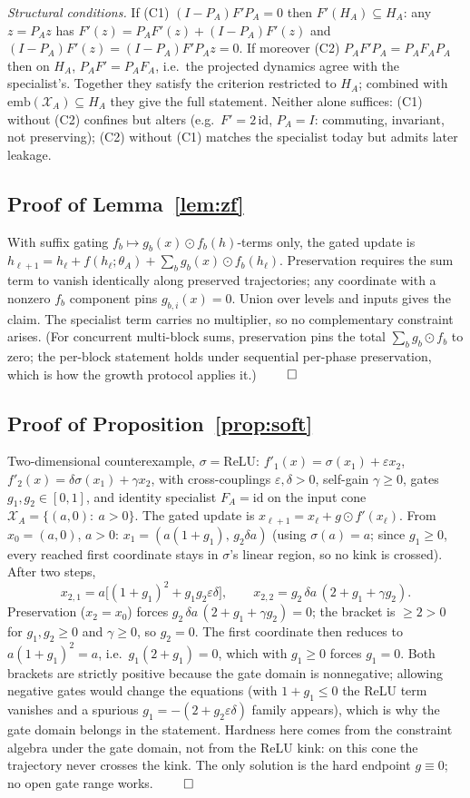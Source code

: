 \documentclass[11pt]{article}
\theoremstyle{definition}\newtheorem{definition}{Definition}
\theoremstyle{remark}\newtheorem{remark}{Remark}
\newcommand{\Xa}{\mathcal{X}_A}
\begin{document}
\emph{Structural conditions.} If (C1) $(I-P_A)F'P_A=0$ then $F'(H_A)\subseteq H_A$: any
$z=P_Az$ has $F'(z)=P_AF'(z)+(I-P_A)F'(z)$ and $(I-P_A)F'(z)=(I-P_A)F'P_Az=0$. If moreover
(C2) $P_AF'P_A=P_AF_AP_A$ then on $H_A$, $P_AF'=P_AF_A$, i.e.\ the projected dynamics agree
with the specialist's. Together they satisfy the criterion restricted to $H_A$; combined
with $\mathrm{emb}(\Xa)\subseteq H_A$ they give the full statement. Neither alone suffices: (C1)
without (C2) confines but alters (e.g.\ $F'=2\,\mathrm{id}$, $P_A=I$: commuting, invariant,
not preserving); (C2) without (C1) matches the specialist today but admits later leakage.

\subsection{Proof of Lemma~\ref{lem:zf}}
With suffix gating $f_b\mapsto g_b(x)\odot f_b(h)$-terms only, the gated update is
$h_{\ell+1}=h_\ell+f(h_\ell;\theta_A)+\sum_b g_b(x)\odot f_b(h_\ell)$. Preservation
requires the sum term to vanish identically along preserved trajectories; any coordinate
with a nonzero $f_b$ component pins $g_{b,i}(x)=0$. Union over levels and inputs gives the
claim. The specialist term carries no multiplier, so no complementary constraint arises.
(For concurrent multi-block sums, preservation pins the total $\sum_b g_b\odot f_b$ to
zero; the per-block statement holds under sequential per-phase preservation, which is how
the growth protocol applies it.)
\hfill$\qed$

\subsection{Proof of Proposition~\ref{prop:soft}}
Two-dimensional counterexample, $\sigma=\mathrm{ReLU}$:
$f'_1(x)=\sigma(x_1)+\varepsilon x_2$, $f'_2(x)=\delta\sigma(x_1)+\gamma x_2$, with
cross-couplings $\varepsilon,\delta>0$, self-gain $\gamma\ge0$, gates $g_1,g_2\in[0,1]$,
and identity specialist $F_A=\mathrm{id}$ on the input cone $\Xa=\{(a,0):\ a>0\}$. The
gated update is $x_{\ell+1}=x_\ell+g\odot f'(x_\ell)$. From $x_0=(a,0)$, $a>0$:
$x_1=(a(1{+}g_1),\,g_2\delta a)$ (using $\sigma(a)=a$; since $g_1\ge0$, every reached first
coordinate stays in $\sigma$'s linear region, so no kink is crossed). After two steps,
\[
x_{2,1}=a\bigl[(1{+}g_1)^2+g_1g_2\varepsilon\delta\bigr],\qquad
x_{2,2}=g_2\,\delta a\,(2+g_1+\gamma g_2).
\]
Preservation ($x_2=x_0$) forces $g_2\,\delta a\,(2+g_1+\gamma g_2)=0$; the bracket is
$\ge2>0$ for $g_1,g_2\ge0$ and $\gamma\ge0$, so $g_2=0$. The first coordinate then reduces
to $a(1{+}g_1)^2=a$, i.e.\ $g_1(2+g_1)=0$, which with $g_1\ge0$ forces $g_1=0$. Both
brackets are strictly positive because the gate domain is nonnegative; allowing negative
gates would change the equations (with $1+g_1\le0$ the ReLU term vanishes and a spurious
$g_1=-(2+g_2\varepsilon\delta)$ family appears), which is why the gate domain belongs in
the statement. Hardness here comes from the constraint algebra under the gate domain, not
from the ReLU kink: on this cone the trajectory never crosses the kink. The only solution
is the hard endpoint $g\equiv0$; no open gate range works.
\hfill$\qed$
\end{document}
